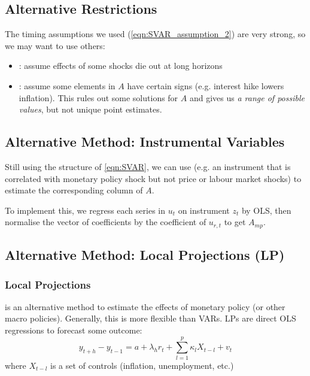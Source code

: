         \subsection{Alternative Restrictions}

            The timing assumptions we used (\ref{eqn:SVAR_assumption_2}) are very strong, so we may want to use others:
            \begin{itemize}
                \item {}: assume effects of some shocks die out at long horizons
                \item {}: assume some elements in $A$ have certain signs (e.g. interest hike lowers inflation). This rules out some solutions for $A$ and gives us \emph{a range of possible values}, but not unique point estimates.
            \end{itemize}
            
        \subsection{Alternative Method: Instrumental Variables}

            Still using the structure of \ref{eqn:SVAR}, we can use  (e.g. an instrument that is correlated with monetary policy shock but not price or labour market shocks) to estimate the corresponding column of $A$.

            To implement this, we regress each series in $u_t$ on instrument $z_t$ by OLS, then normalise the vector of coefficients by the coefficient of $u_{r,t}$ to get $A_{mp}$.

        \subsection{Alternative Method: Local Projections (LP)}

            \subsubsection{Local Projections}
            
                 is an alternative method to estimate the effects of monetary policy (or other macro policies). Generally, this is more flexible than VARs. LPs are direct OLS regressions to forecast some outcome:
                \begin{equation}
                    y_{t+h}-y_{t-1}=a+\lambda_hr_t+\sum_{l=1}^p \kappa_l X_{t-l} +v_t
                    \tag{Local Projections}
                \end{equation}
                where $X_{t-l}$ is a set of controls (inflation, unemployment, etc.)
                
